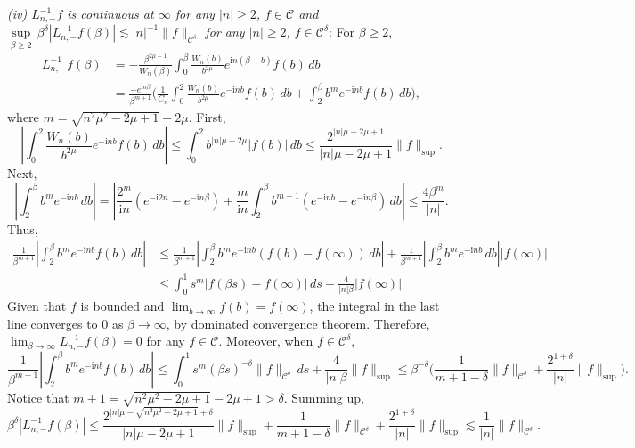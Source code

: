 \documentclass[11pt]{article}
\makeatletter
\renewenvironment{proof}[1][\proofname]{\par
  \vspace{-.7\topsep}%
  \pushQED{\qed}%
  \normalfont
  \topsep0pt \partopsep0pt %
  \trivlist
  \item[\hskip\labelsep
        \itshape
    #1\@addpunct{.}]\ignorespaces
}{%
  \popQED\endtrivlist\@endpefalse
  \addvspace{6pt plus 6pt} %
}
\theoremstyle{definition}
\theoremstyle{remark}
\numberwithin{equation}{section}
\newcommand{\mcal}{\mathcal}
\newcommand{\abs}[1]{\left\lvert #1 \right\rvert}
\newcommand{\norm}[1]{\lVert #1 \rVert}
\makeatother
\begin{document}
\begin{proof}
\noindent\textit{(iv) $L_{n,-}^{-1} f$ is continuous at $\infty$ for any $|n|\geq 2$, $f\in \mcal{C}$ and $\underset{\beta \geq 2}{\sup} \,\beta^\delta |L_{n,-}^{-1} f(\beta)| \lesssim |n|^{-1} \norm{f}_{\mcal{C}^\delta}$ for any $|n|\geq 2$, $f\in \mcal{C}^\delta$}: For $\beta \geq 2$,
\begin{align*}
L_{n,-}^{-1} f(\beta) &= - \frac{\beta^{2\mu - 1}}{W_n(\beta)} \int_0^\beta \frac{W_n(b)}{b^{2\mu}} e^{\textrm{i}n(\beta - b)} f(b) \,db \\
&= \frac{-e^{\textrm{i}n \beta}}{\beta^{m + 1}} \bigg( \frac{1}{C_n} \int_0^2 \frac{W_n(b)}{b^{2\mu}} e^{-\textrm{i}n b} f(b) \,db + \int_2^\beta b^{m} e^{-\textrm{i}n b} f(b) \,db \bigg),
\end{align*}
where $m = \sqrt{n^2\mu^2 - 2\mu + 1} - 2\mu$. First,
\[\abs{\int_0^2 \frac{W_n(b)}{b^{2\mu}} e^{-\textrm{i}n b} f(b) \,db} \leq \int_0^2 b^{|n|\mu - 2\mu} |f(b)| \,db \leq \frac{2^{|n|\mu - 2\mu + 1}}{|n|\mu - 2\mu + 1} \norm{f}_{\sup}.\]
Next,
\[ \abs{\int_2^\beta b^m e^{-\textrm{i}n b} \,db} = \abs{\frac{2^m}{\textrm{i}n}(e^{-\textrm{i}2n} - e^{-\textrm{i}n\beta}) +\frac{m}{\textrm{i}n} \int_2^\beta b^{m-1} (e^{-\textrm{i}n b} - e^{-\textrm{i}n\beta}) \, db} \leq \frac{4\beta^m}{|n|}.\]
Thus,
\begin{align*}
\frac{1}{\beta^{m+1}} \abs{\int_2^\beta b^m e^{-\textrm{i}n b} f(b) \,db} &\leq \frac{1}{\beta^{m+1}} \abs{\int_2^\beta b^m e^{-\textrm{i}n b} (f(b) - f(\infty)) \,db} + \frac{1}{\beta^{m+1}} \abs{\int_2^\beta b^m e^{-\textrm{i}n b} \,db} |f(\infty)| \\
& \leq \int_{0}^1 s^m |f(\beta s) - f(\infty)| \,ds + \frac{4}{|n| \beta} |f(\infty)|
\end{align*}
Given that $f$ is bounded and $\displaystyle \lim_{b\to \infty} f(b) = f(\infty)$, the integral in the last line converges to $0$ as $\beta \to \infty$, by dominated convergence theorem. Therefore, $\displaystyle\lim_{\beta \to \infty} L^{-1}_{n,-} f(\beta) = 0$ for any $f\in \mcal{C}$. Moreover, when $f\in \mcal{C}^\delta$,
\[ \frac{1}{\beta^{m+1}} \abs{\int_2^\beta b^m e^{-\textrm{i}n b} f(b) \,db} \leq \int_0^1 s^m (\beta s)^{-\delta} \norm{f}_{\mcal{C}^\delta} \,ds + \frac{4}{|n|\beta} \norm{f}_{\sup} \leq \beta^{-\delta} \bigg( \frac{1}{m+1-\delta} \norm{f}_{\mcal{C}^\delta} + \frac{2^{1+\delta}}{|n|} \norm{f}_{\sup} \bigg).\]
Notice that $m+1 = \sqrt{n^2 \mu^2 - 2\mu + 1} - 2\mu + 1 > \delta$. Summing up,
\[ \beta^\delta |L_{n,-}^{-1} f(\beta)| \leq \frac{2^{|n|\mu - \sqrt{n^2\mu^2 - 2\mu + 1}+\delta}}{|n|\mu - 2\mu + 1} \norm{f}_{\sup} + \frac{1}{m+1-\delta} \norm{f}_{\mcal{C}^\delta} + \frac{2^{1+\delta}}{|n|} \norm{f}_{\sup} \lesssim \frac{1}{|n|} \norm{f}_{\mcal{C}^\delta}.\]

\end{proof}
\end{document}
